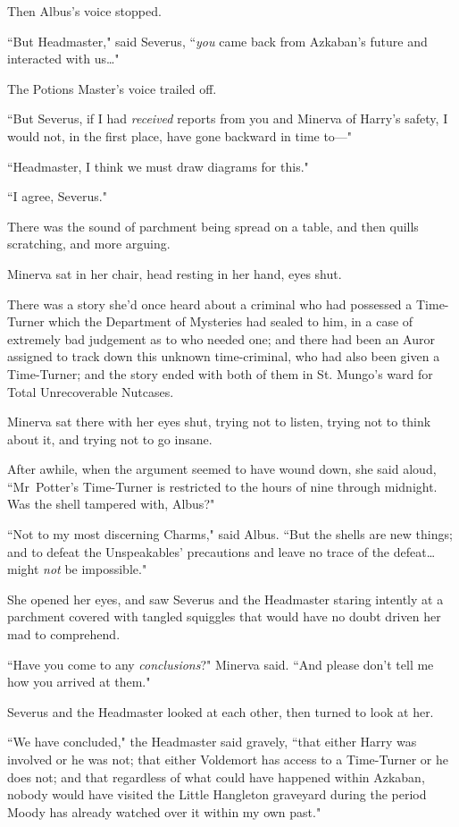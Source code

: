 Then Albus's voice stopped.

``But Headmaster," said Severus, ``\emph{you} came back from Azkaban's future and interacted with us…"

The Potions Master's voice trailed off.

``But Severus, if I had \emph{received} reports from you and Minerva of Harry's safety, I would not, in the first place, have gone backward in time to—"

``Headmaster, I think we must draw diagrams for this."

``I agree, Severus."

There was the sound of parchment being spread on a table, and then quills scratching, and more arguing.

Minerva sat in her chair, head resting in her hand, eyes shut.

There was a story she'd once heard about a criminal who had possessed a Time-Turner which the Department of Mysteries had sealed to him, in a case of extremely bad judgement as to who needed one; and there had been an Auror assigned to track down this unknown time-criminal, who had also been given a Time-Turner; and the story ended with both of them in St. Mungo's ward for Total Unrecoverable Nutcases.

Minerva sat there with her eyes shut, trying not to listen, trying not to think about it, and trying not to go insane.

After awhile, when the argument seemed to have wound down, she said aloud, ``Mr~Potter's Time-Turner is restricted to the hours of nine \pm through midnight. Was the shell tampered with, Albus?"

``Not to my most discerning Charms," said Albus. ``But the shells are new things; and to defeat the Unspeakables' precautions and leave no trace of the defeat…might \emph{not} be impossible."

She opened her eyes, and saw Severus and the Headmaster staring intently at a parchment covered with tangled squiggles that would have no doubt driven her mad to comprehend.

``Have you come to any \emph{conclusions}?" Minerva said. ``And please don't tell me how you arrived at them."

Severus and the Headmaster looked at each other, then turned to look at her.

``We have concluded," the Headmaster said gravely, ``that either Harry was involved or he was not; that either Voldemort has access to a Time-Turner or he does not; and that regardless of what could have happened within Azkaban, nobody would have visited the Little Hangleton graveyard during the period Moody has already watched over it within my own past."

